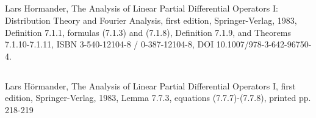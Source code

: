 \documentclass[10pt,oneside]{article}
\begin{document}
\subsection*{\texttt{}}
Lars Hormander, The Analysis of Linear Partial Differential Operators I: Distribution Theory and Fourier Analysis, first edition, Springer-Verlag, 1983, Definition 7.1.1, formulas (7.1.3) and (7.1.8), Definition 7.1.9, and Theorems 7.1.10-7.1.11, ISBN 3-540-12104-8 / 0-387-12104-8, DOI 10.1007/978-3-642-96750-4.

\subsection*{\texttt{}}
Lars Hörmander, The Analysis of Linear Partial Differential Operators I, first edition, Springer-Verlag, 1983, Lemma 7.7.3, equations (7.7.7)-(7.7.8), printed pp. 218-219
\end{document}
